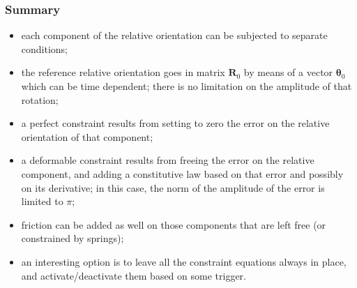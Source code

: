 \documentclass[10pt,dvips,fleqn]{report}
\newcommand{\T}[1]{\boldsymbol{#1}}
\begin{document}
\subsubsection{Summary}
\begin{itemize}
\item each component of the relative orientation can be subjected
to separate conditions;
\item the reference relative orientation goes in matrix $\T{R}_0$
by means of a vector $\T{\theta}_0$ which can be time dependent;
there is no limitation on the amplitude of that rotation;
\item a perfect constraint results from setting to zero the error
on the relative orientation of that component;
\item a deformable constraint results from freeing the error
on the relative component, and adding a constitutive law
based on that error and possibly on its derivative;
in this case, the norm of the amplitude of the error is limited
to $\pi$;
\item friction can be added as well on those components
that are left free (or constrained by springs);
\item an interesting option is to leave all the constraint equations
always in place, and activate/deactivate them based on some trigger.
\end{itemize}
\end{document}
